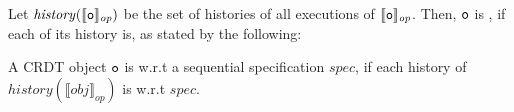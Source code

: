 Let $\mathit{history}(\llbracket \mathtt{o} \rrbracket_{\mathit{op}})$ be the set of histories of all executions of $\llbracket \mathtt{o} \rrbracket_{\mathit{op}}$. Then, $\mathtt{o}$ is \crdtlinearizable{}, if each of its history is, as stated by the following:

\begin{definition}
\label{definition:correctness of a CRDT object}
A CRDT object $\mathtt{o}$ is \crdtlinearizable{} w.r.t a sequential specification $\mathit{spec}$, if each history of $\mathit{history}(\llbracket \mathit{obj} \rrbracket_{\mathit{op}})$ is \crdtlinearizable{} w.r.t $\mathit{spec}$.
\end{definition}

















